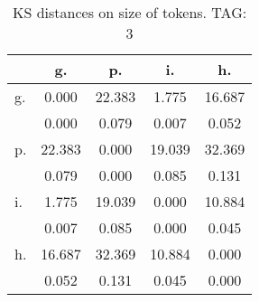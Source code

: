 \begin{table}[h!]
\begin{center}
\begin{tabular}{| l | c | c | c | c |}\hline
 & g. & p. & i. & h. \\\hline
g. & 0.000  & 22.383  & 1.775  & 16.687 \\\hline
 & 0.000  & 0.079  & 0.007  & 0.052 \\\hline
p. & 22.383  & 0.000  & 19.039  & 32.369 \\\hline
 & 0.079  & 0.000  & 0.085  & 0.131 \\\hline
i. & 1.775  & 19.039  & 0.000  & 10.884 \\\hline
 & 0.007  & 0.085  & 0.000  & 0.045 \\\hline
h. & 16.687  & 32.369  & 10.884  & 0.000 \\\hline
 & 0.052  & 0.131  & 0.045  & 0.000 \\\hline
\end{tabular}
\caption{KS distances on size of tokens. TAG: 3}
\end{center}
\end{table}
